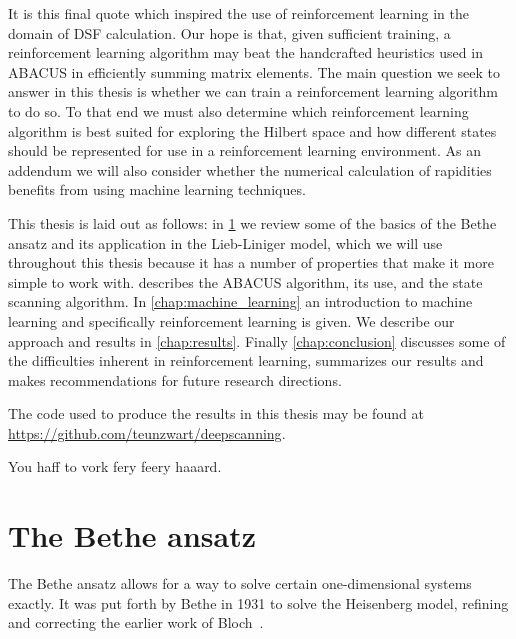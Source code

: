 \documentclass[11pt, a4paper]{report} %
\begin{document}
It is this final quote which inspired the use of reinforcement learning in the domain of DSF calculation.
Our hope is that, given sufficient training, a reinforcement learning algorithm may beat the handcrafted heuristics used in ABACUS in efficiently summing matrix elements.
The main question we seek to answer in this thesis is whether we can train a reinforcement learning algorithm to do so.
To that end we must also determine which reinforcement learning algorithm is best suited for exploring the Hilbert space and how different states should be represented for use in a reinforcement learning environment.
As an addendum we will also consider whether the numerical calculation of rapidities benefits from using machine learning techniques.

This thesis is laid out as follows:
in \cref{chap:bethe_ansatz} we review some of the basics of the Bethe ansatz and its application in the Lieb-Liniger model, which we will use throughout this thesis because it has a number of properties that make it more simple to work with.
 describes the ABACUS algorithm, its use, and the state scanning algorithm.
In \cref{chap:machine_learning} an introduction to machine learning and specifically reinforcement learning is given.
We describe our approach and results in \cref{chap:results}.
Finally \cref{chap:conclusion} discusses some of the difficulties inherent in reinforcement learning, summarizes our results and makes recommendations for future research directions.

\begin{sloppypar}
The code used to produce the results in this thesis may be found at \href{https://github.com/teunzwart/deepscanning}{https://github.com/teunzwart/deepscanning}.
\end{sloppypar}

\begin{savequote}[50mm]
You haff to vork fery feery haaard.
\end{savequote}

\chapter{The Bethe ansatz}\label{chap:bethe_ansatz}


\noindent
The Bethe ansatz allows for a way to solve certain one-dimensional systems exactly.
It was put forth by Bethe in 1931 to solve the Heisenberg model, refining and correcting the earlier work of Bloch~\cite{Bethe1931}.
\end{document}
